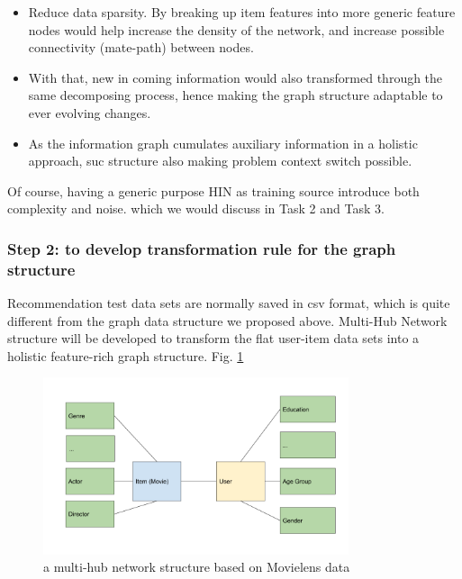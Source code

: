 \documentclass[12pt,a4 paper,title page]{article}
\theoremstyle{definition}
\begin{document}
\begin{itemize}
    
\item[1] Reduce data sparsity. By breaking up item features into more generic feature nodes would help increase the density of the network, and increase possible connectivity (mate-path) between nodes.

\item[2] With that, new in coming information would also transformed through the same decomposing process, hence making the graph structure adaptable to ever evolving changes.

\item[3] As the information graph cumulates auxiliary information in a holistic approach, suc structure also making problem context switch possible.

\end{itemize}

Of course, having a generic purpose HIN as training source introduce both complexity and noise. which we would discuss in Task 2 and Task 3.


\subsubsection*{Step 2: to develop transformation rule for the graph structure}

Recommendation test data sets are normally saved in csv format, which is quite different from the graph data structure we proposed above. Multi-Hub Network structure will be developed to transform the flat user-item data sets into a holistic feature-rich graph structure. Fig. \ref{fig:multihub}

\begin{figure}[!t]
    \centering
    \includegraphics[width=0.8\textwidth]{figs/multi-hub.png}
    \caption{a multi-hub network structure based on Movielens data}\label{fig:multihub}
\end{figure}
\end{document}
